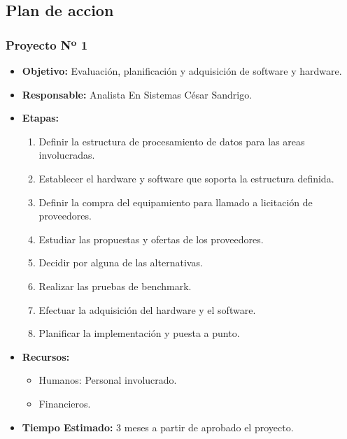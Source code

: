\subsection{Plan de accion}

\subsubsection{Proyecto Nº 1}

\begin{itemize}
\item \textbf{Objetivo:} Evaluación, planificación y adquisición de software y hardware.
\item \textbf{Responsable:} Analista En Sistemas César Sandrigo.
\item \textbf{Etapas:}
\begin{enumerate}
\item Definir la estructura de procesamiento de datos para las areas involucradas.
\item Establecer el hardware y software que soporta la estructura definida.
\item Definir la compra del equipamiento para llamado a licitación de proveedores.
\item Estudiar las propuestas y ofertas de los proveedores.
\item Decidir por alguna de las alternativas.
\item Realizar las pruebas de benchmark.
\item Efectuar la adquisición del hardware y el software.
\item Planificar la implementación y puesta a punto.
\end{enumerate}
\item \textbf{Recursos:}
\begin{itemize}
\item Humanos: Personal involucrado.
\item Financieros.
\end{itemize}
\item \textbf{Tiempo Estimado:} 3 meses a partir de aprobado el proyecto.
\end{itemize}

